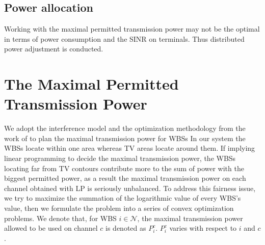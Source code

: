 \subsection{Power allocation}
\label{PA}
Working with the maximal permitted transmission power may not be the optimal in terms of power consumption and the SINR on terminals.
Thus distributed power adjustment is conducted.




%
%




\section{The Maximal Permitted Transmission Power}
\label{powermap}
We adopt the interference model and the optimization methodology from the work of \cite{multipleIntf_pimrc11} to plan the maximal transmission power for WBSs 
In our system the WBSs locate within one area whereas TV areas locate around them. If implying linear programming to decide the maximal transmission power, the WBSs locating far from TV contours contribute more to the sum of power with the biggest permitted power, as a result the maximal transmission power on each channel obtained with LP is seriously unbalanced. To address this fairness issue, we try to maximize the summation of the logarithmic value of every WBS's value, then we formulate the problem into a series of convex optimization problems. We denote that, for WBS $i\in \mathcal{N}$, the maximal transmission power allowed to be used on channel $c$ is denoted as $P_i^c$. $P_i^c$ varies with respect to $i$ and $c$. 

